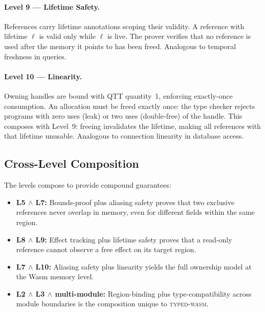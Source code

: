 \documentclass[11pt,a4paper]{article}
\newcommand{\typedwasm}{\textsc{typed-wasm}}
\begin{document}
\paragraph{Level 9 --- Lifetime Safety.}
References carry lifetime annotations scoping their validity.  A
reference with lifetime $\ell$ is valid only while $\ell$ is live.  The
prover verifies that no reference is used after the memory it points to
has been freed.  Analogous to temporal freshness in queries.

\paragraph{Level 10 --- Linearity.}
Owning handles are bound with QTT quantity~1, enforcing exactly-once
consumption.  An allocation must be freed exactly once: the type checker
rejects programs with zero uses (leak) or two uses (double-free) of the
handle.  This composes with Level~9: freeing invalidates the lifetime,
making all references with that lifetime unusable.  Analogous to
connection linearity in database access.

\subsection{Cross-Level Composition}
\label{sec:composition}

The levels compose to provide compound guarantees:

\begin{itemize}
  \item \textbf{L5 $\wedge$ L7:} Bounds-proof plus aliasing safety
    proves that two exclusive references never overlap in memory, even
    for different fields within the same region.

  \item \textbf{L8 $\wedge$ L9:} Effect tracking plus lifetime safety
    proves that a read-only reference cannot observe a free effect on its
    target region.

  \item \textbf{L7 $\wedge$ L10:} Aliasing safety plus linearity yields
    the full ownership model at the Wasm memory level.

  \item \textbf{L2 $\wedge$ L3 $\wedge$ multi-module:} Region-binding
    plus type-compatibility across module boundaries is the composition
    unique to \typedwasm{}.
\end{itemize}

\end{document}
